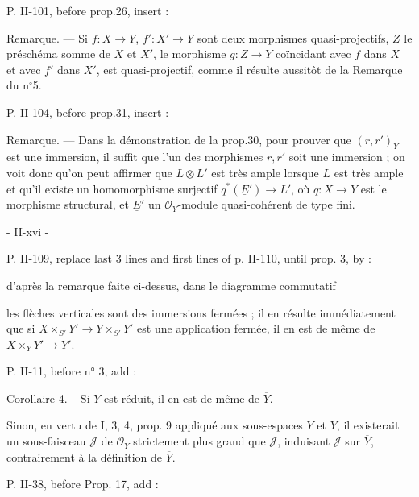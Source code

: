 \vspace{1em}

\noindent P. II-101, before prop.26, insert :

\noindent Remarque. — Si $f : X \to Y$, $f' : X' \to Y$ sont deux morphismes quasi-projectifs, $Z$ le préschéma somme de $X$ et $X'$, le morphisme $g : Z \to Y$ coïncidant avec $f$ dans $X$ et avec $f'$ dans $X'$, est quasi-projectif, comme il résulte aussitôt de la Remarque du n$^\circ$5.

\vspace{1em}

\noindent P. II-104, before prop.31, insert :

\noindent Remarque. — Dans la démonstration de la prop.30, pour prouver que $(r, r')_Y$ est une immersion, il suffit que l'un des morphismes $r, r'$ soit une immersion ; on voit donc qu'on peut affirmer que $L \otimes L'$ est très ample lorsque $L$ est très ample et qu'il existe un homomorphisme surjectif $q^* (\underline{E}') \to L'$, où $q : X \to Y$ est le morphisme structural, et $\underline{E}'$ un $\mathcal{O}_Y$-module quasi-cohérent de type fini.

\newpage


- II-xvi -

P. II-109, replace last 3 lines and first lines of p. II-110, until prop. 3, by :

d'après la remarque faite ci-dessus, dans le diagramme commutatif
les flèches verticales sont des immersions fermées ; il en résulte immédiatement que si $X \times_{S'} Y' \to Y \times_{S'} Y'$ est une application fermée, il en est de même de $X \times_Y Y' \to Y'$.

P. II-11, before n° 3, add :

Corollaire 4. -- Si $Y$ est réduit, il en est de même de $\overline{Y}$.

Sinon, en vertu de I, 3, 4, prop. 9 appliqué aux sous-espaces $Y$ et $\overline{Y}$, il existerait un sous-faisceau $\mathcal{J}$ de $\mathcal{O}_Y$ strictement plus grand que $\mathcal{J}$, induisant $\mathcal{J}$ sur $\overline{Y}$, contrairement à la définition de $\overline{Y}$.

P. II-38, before Prop. 17, add :

